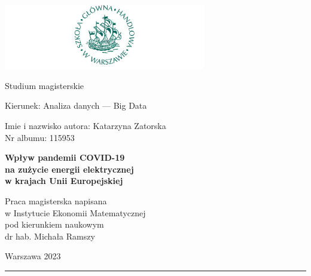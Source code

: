 \documentclass[polish, twoside, 12pt, a4paper]{article}
\theoremstyle{definition}
\theoremstyle{plain}
\theoremstyle{remark}
\begin{document}
\begin{titlepage}
\centering

\includegraphics[width=0.66\textwidth]{logo.JPG}

\vspace*{0.5cm}
Studium magisterskie\\
\begin{flushleft}
Kierunek: Analiza danych --- Big Data\\
\end{flushleft}

\vspace*{.5cm}
\rule{0cm}{1cm}\hfill
\begin{minipage}{9cm}
Imie i nazwisko autora: Katarzyna Zatorska\\
Nr albumu: 115953
\end{minipage}

\vspace*{1cm}
\begin{minipage}{12cm}
\centering
\Large
\textbf{Wpływ pandemii COVID-19\\na zużycie energii elektrycznej\\w krajach Unii Europejskiej}
\end{minipage}

\vspace*{2cm}
\rule{0cm}{1cm}\hfill
\begin{minipage}{9cm}
Praca magisterska napisana\\
w Instytucie Ekonomii Matematycznej\\
pod kierunkiem naukowym\\
dr hab. Michała Ramszy
\end{minipage}

\vfill
Warszawa 2023
\end{titlepage}

\rule{1ex}{0ex}\clearpage


\cleardoublepage
\setcounter{tocdepth}{2}
\tableofcontents
\end{document}

